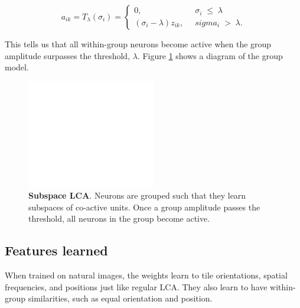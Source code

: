 \begin{equation}\label{eq:ch3_subspace_threshold_func}
    a_{ik} = T_{\lambda}(\sigma_{i}) = \left\{
    \begin{aligned}
        0,\;\; & \sigma_{i}\; \leq\; \lambda \\
        (\sigma_{i}-\lambda)z_{ik},\;\; &sigma_{i}\; >\; \lambda.
    \end{aligned}
    \right.
\end{equation}

This tells us that all within-group neurons become active when the group amplitude surpasses the threshold, $\lambda$. Figure \ref{fig:ch3_subspace_lca_graph} shows a diagram of the group model.

\begin{figure}\label{fig:ch3_subspace_lca_graph}
    \centering
    \includegraphics[width=0.5\textwidth]{figures/subspace_lca_graph.svg}
    \caption{\textbf{Subspace LCA}. Neurons are grouped such that they learn subspaces of co-active units. Once a group amplitude passes the threshold, all neurons in the group become active.}
\end{figure}

\subsection{Features learned}
When trained on natural images, the weights learn to tile orientations, spatial frequencies, and positions just like regular LCA. They also learn to have within-group similarities, such as equal orientation and position.

